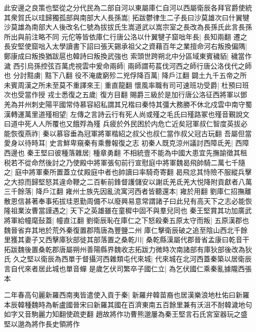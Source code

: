 此安邊之良策也堅從之分代民為二部自河以東屬庫仁自河以西屬衛辰各拜官爵使統其衆賀氏以珪歸獨孤部與南部大人長孫嵩|{
	拓跋鬱律生二子長曰沙莫雄次曰什翼犍沙莫雄為南部大人後改名仁號為拔拔氏生嵩道武以嵩宗室之長改為長孫氏此言長孫所出與前注略不同}
元佗等皆依庫仁行唐公洛以什翼犍子窟咄年長|{
	長知兩翻}
遷之長安堅使窟咄入太學讀書下詔曰張天錫承祖父之資藉百年之業擅命河右叛換偏隅|{
	鄭康成曰叛換猶跋扈也韓詩曰叛換武強也}
索頭世跨朔北中分區域東賓穢貊|{
	穢當作濊}
西引烏孫控弦百萬虎視雲中爰命兩師|{
	兩師謂苟萇伐河西之師行唐公洛伐代之師也}
分討黠虜|{
	黠下八翻}
役不淹歲窮殄二兇俘降百萬|{
	降戶江翻}
闢土九千五帝之所未賓周漢之所未至莫不重譯來王|{
	重直龍翻}
懷風率職有司可速班功受爵|{
	杜預曰班次也受當作授}
戎士悉復之五歲|{
	復方目翻}
賜爵三級於是加行唐公洛征西將軍以鄧羌為并州刺史陽平國常侍慕容紹私謂其兄楷曰秦恃其彊大務勝不休北戍雲中南守蜀漢轉運萬里道殣相望|{
	左傳之言詩云行有死人尚或殣之毛氏曰殣路冢也殣音覲說文曰道中死人人所覆也又餓殍為殣}
兵疲於外民困於内危亡近矣冠軍叔仁智度英拔必能恢復燕祚|{
	秦以慕容垂為冠軍將軍楷紹之叔父也叔仁當作叔父冠古玩翻}
吾屬但當愛身以待時耳|{
	史言鮮卑窺秦有乘釁報復之志}
初秦人既克涼州議討西障氐羌|{
	西障西邊也}
秦王堅曰彼種落雜居|{
	種章勇翻}
不相統壹不能為中國大患宜先撫諭徵其租税若不從命然後討之乃使殿中將軍張旬前行宣慰庭中將軍魏曷飛帥騎二萬七千隨之|{
	庭中將軍秦所置蓋立仗殿庭中者也帥讀曰率騎奇寄翻}
曷飛忿其恃險不服縱兵擊之大掠而歸堅怒其違命鞭之二百斬前鋒督護儲安以謝氐羌氐羌大悦降附貢獻者八萬三千餘落|{
	降戶江翻}
雍州士族先因亂流寓河西者皆聽還本|{
	雍於用翻}
劉庫仁招撫離散恩信甚著奉事拓拔珪恩勤周備不以廢興易意常謂諸子曰此兒有高天下之志必能恢隆祖業汝曹當謹遇之|{
	天下之英雄雖在童穉中固不與羣兒同也}
秦王堅賞其功加廣武將軍給幢麾鼔蓋|{
	幢直江翻}
劉衛辰恥在庫仁之下怒殺秦五原太守而叛|{
	五原漢郡也魏晉省弃其地於荒外秦復置郡隋唐為豐鹽二州}
庫仁擊衛辰破之追至陰山西北千餘里獲其妻子又西擊庫狄部徙其部落置之桑乾川|{
	桑乾縣漢屬代郡晉省孟康曰乾音干拓跋魏後置桑乾郡唐屬朔州善陽縣界魏收志拓跋力微時次南諸部有庫狄部後改為狄氏}
久之堅以衛辰為西單于督攝河西雜類屯代來城|{
	代來城在北河西蓋秦築以居衛辰言自代來者居此城也單音蟬}
是歲乞伏司繁卒子國仁立|{
	為乞伏國仁乘秦亂據隴西張本}


二年春高句麗新羅西南夷皆遣使入貢于秦|{
	新羅弁韓苗裔也居漢樂浪地杜佑曰新羅本辰韓種魏時為斬盧國晉宋曰新羅其國在百濟東南五百餘里兼有沃沮不耐韓濊地句如字又音駒麗力知翻使疏吏翻}
趙故將作功曹熊邈屢為秦王堅言石氏宮室器玩之盛堅以邈為將作長史領將作

